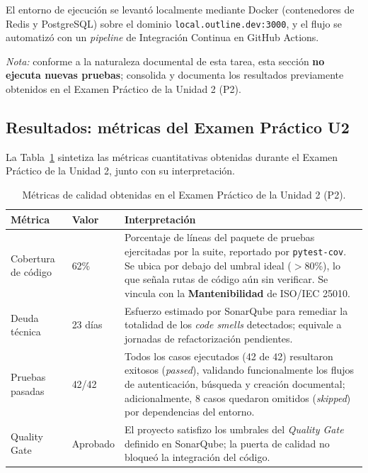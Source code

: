 \documentclass[12pt, letterpaper]{article}
\begin{document}
El entorno de ejecución se levantó localmente mediante Docker (contenedores de Redis y PostgreSQL) sobre el dominio \texttt{local.outline.dev:3000}, y el flujo se automatizó con un \textit{pipeline} de Integración Continua en GitHub Actions.

\vspace{4pt}
\noindent\textit{Nota:} conforme a la naturaleza documental de esta tarea, esta sección \textbf{no ejecuta nuevas pruebas}; consolida y documenta los resultados previamente obtenidos en el Examen Práctico de la Unidad 2 (P2).

\subsection{Resultados: métricas del Examen Práctico U2}

La Tabla~\ref{tab:metricas-p2} sintetiza las métricas cuantitativas obtenidas durante el Examen Práctico de la Unidad 2, junto con su interpretación.

\begin{table}[H]
\centering
\caption{Métricas de calidad obtenidas en el Examen Práctico de la Unidad 2 (P2).}
\label{tab:metricas-p2}
\begin{tabular}{|p{3.1cm}|p{2.4cm}|p{8.4cm}|}
\hline
\textbf{Métrica} & \textbf{Valor} & \textbf{Interpretación} \\
\hline
Cobertura de código & 62\% &
Porcentaje de líneas del paquete de pruebas ejercitadas por la suite, reportado por \texttt{pytest-cov}. Se ubica por debajo del umbral ideal ($>$80\%), lo que señala rutas de código aún sin verificar. Se vincula con la \textbf{Mantenibilidad} de ISO/IEC 25010. \\
\hline
Deuda técnica & 23 días &
Esfuerzo estimado por SonarQube para remediar la totalidad de los \textit{code smells} detectados; equivale a jornadas de refactorización pendientes. \\
\hline
Pruebas pasadas & 42/42 &
Todos los casos ejecutados (42 de 42) resultaron exitosos (\textit{passed}), validando funcionalmente los flujos de autenticación, búsqueda y creación documental; adicionalmente, 8 casos quedaron omitidos (\textit{skipped}) por dependencias del entorno. \\
\hline
Quality Gate & Aprobado &
El proyecto satisfizo los umbrales del \textit{Quality Gate} definido en SonarQube; la puerta de calidad no bloqueó la integración del código. \\
\hline
\end{tabular}
\end{table}
\end{document}

